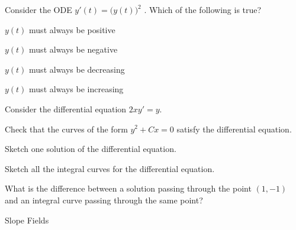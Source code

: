 \bookonlynewpage

\question

Consider the ODE \quad $y'(t) = \big(y(t)\big)^2$ \quad .
Which of the following is true?
	
\begin{parts}
	\item $y(t)$ must always be positive
	\item $y(t)$ must always be negative \\[5pt]

	\item $y(t)$ must always be decreasing
	\item $y(t)$ must always be increasing
\end{parts}




\bookonlynewpage

\question Consider the differential equation $2xy'=y$.
	
	\begin{parts}
		\item Check that the curves of the form $y^2 + C x = 0$ satisfy the differential equation.
		\item Sketch one solution of the differential equation.
		\item Sketch all the integral curves for the differential equation.
		\item What is the difference between a solution passing through the point $(1,-1)$ and an integral curve passing through the same point?
	\end{parts}











%
%



\begin{module}{Slope Fields}
	\label{intro-slopefields}

	
	
\end{module}



